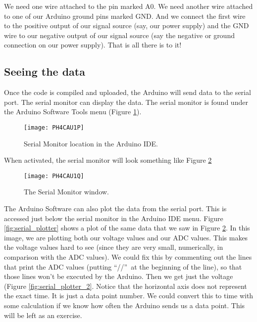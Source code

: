 We need one wire attached to the pin marked A0. We need another wire
attached to one of our Arduino ground pins marked GND. And we connect the
first wire to the positive output of our signal source (say, our power
supply) and the GND wire to our negative output of our signal source (say
the negative or ground connection on our power supply). That is all there is
to it!

\subsection{Seeing the data}

Once the code is compiled and uploaded, the Arduino will send data to the
serial port. The serial monitor can display the data. The serial monitor is
found under the Arduino Software Tools menu 
(Figure \ref{fig:serial_monitor_menu}).

\begin{figure}[htbp!]
\centering
\texttt{[image: PH4CAU1P]}
\caption[Serial Monitor location in the Arduino IDE]{Serial Monitor
location in the Arduino IDE.}
\label{fig:serial_monitor_menu}
\end{figure}

When activated, the serial monitor will look something like
Figure \ref{fig:serial_monitor}

\begin{figure}[htbp!]
\centering
\texttt{[image: PH4CAU1Q]}
\caption[The Serial Monitor window]{The Serial Monitor window.}
\label{fig:serial_monitor}
\end{figure}

The Arduino Software can also plot the data from the serial port. This is
accessed just below the serial monitor in the Arduino IDE menu.
Figure \ref{fig:serial_plotter} shows a
plot of the same data that we saw in Figure \ref{fig:serial_monitor}. 
In this image, we are plotting both our
voltage values and our ADC values. This makes the voltage
values hard to see (since they are very small, numerically, in comparison
with the ADC values). We could fix this by commenting out the lines that print
the ADC values (putting \textquotedblleft //\textquotedblright\ at the
beginning of the line), so that those lines won't be executed by the Arduino.
Then we get just the voltage (Figure \ref{fig:serial_plotter_2}. 
Notice that the horizontal axis
does not represent the exact time. 
It is just a data point number. We could convert this
to time with some calculation if we know how often the Arduino sends us a
data point. This will be left as an exercise.

